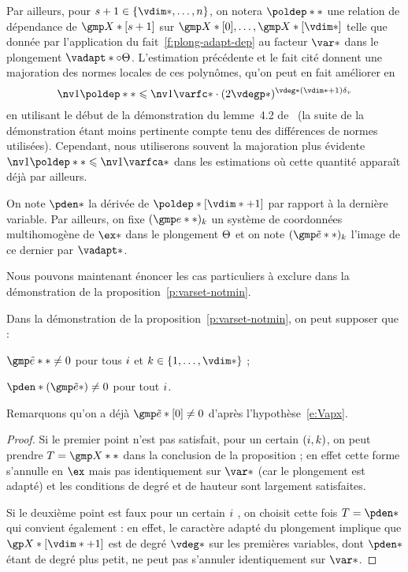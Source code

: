Par ailleurs, pour \( \indi \in \set{\vdim*, \dots, \dimp} \), on notera \(
  \poldep** \) \label{p:def-poldep} une relation de dépendance de \(
  \vmp*[\indi] \) sur \(
  \vmp*[0], \dots, \vmp*[\vdim*] \) telle que donnée par l'application du
fait~\ref{f:plong-adapt-dep} au facteur \( \var* \) dans le plongement \(
  \vadapt* \circ \vaemb \). L'estimation précédente et le fait cité donnent
une majoration des normes locales de ces polynômes, qu'on peut en fait
améliorer en
\begin{equation} \label{e:nv-poldep}
  \nv1{\poldep**} \le \nv1{\varfc*}
  \cdot ( 2 \vdegp* )^{\vdeg* (\vdim* + 1) \dv}
\end{equation}
en utilisant le début de la démonstration du lemme~4.2 de~\cite{remivds} (la
suite de la démonstration étant moins pertinente compte tenu des différences
de normes utilisées). Cependant, nous utiliserons souvent la majoration plus
évidente \( \nv1{\poldep**} \le \nv1{\varfca*} \) dans les estimations où
cette quantité apparaît déjà par ailleurs.

\begin{tdef} \label{d:pden-cexa}
  On note \( \pden* \) la dérivée de \( \poldep*[\vdim*+1] \) par rapport à la
  dernière variable.  Par ailleurs, on fixe \( (\cex**)_\ind \) un système de
  coordonnées multihomogène de \( \ex* \) dans le plongement \( \Theta \) et
  on note \( (\cexa**)_\ind \) l'image de ce dernier par \( \vadapt* \).
\end{tdef}

Nous pouvons maintenant énoncer les cas particuliers à exclure dans la
démonstration de la proposition~\ref{p:varset-notmin}.

\begin{scho} \label{s:part-cases}
  Dans la démonstration de la proposition~\ref{p:varset-notmin}, on peut
  supposer que :
  \begin{enumthm}
    \item \( \cexa** \neq 0 \) pour tous \( i \) et \( \ind \in \set{1,
          \dots, \vdim*} \) ;
    \item \( \pden*(\cexa*) \neq 0 \) pour tout \( i \).
  \end{enumthm}
  Remarquons qu'on a déjà \( \cexa*[0] \neq 0 \) d'après
  l'hypothèse~\eqref{e:Vapx}.
\end{scho}

\begin{proof}
  Si le premier point n'est pas satisfait, pour un certain \( (i, k) \),
  on peut prendre \( T = \vmp** \) dans la conclusion de la
  proposition ; en effet cette forme s'annulle en \( \ex \) mais pas
  identiquement sur \( \var* \) (car le plongement est adapté) et les
  conditions de degré et de hauteur sont largement satisfaites.

  Si le deuxième point est faux pour un certain \( i \) , on choisit cette
  fois \( T = \pden* \) qui convient également : en effet, le caractère adapté
  du plongement implique que \( \vp*[\vdim*+1] \) est de degré \( \vdeg* \)
  sur les premières variables, dont \( \pden* \) étant de degré plus petit, ne
  peut pas s'annuler identiquement sur \( \var* \).
\end{proof}

